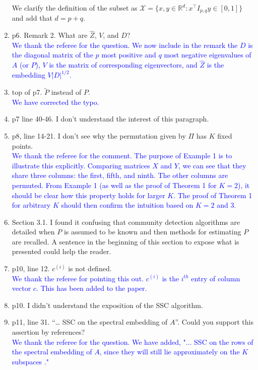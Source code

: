 \documentclass[
]{article}
\begin{document}
\begin{enumerate}
{  We clarify the definition of the subset as $\mathcal{X} = \{x, y \in \mathbb{R}^d : x^\top I_{p, q} y \in [0, 1]\}$ and add that $d = p + q$. 
  }
\item
  p6. Remark 2. What are \(\hat{Z}\), \(V\), and \(D\)?\\
  \textcolor{blue}{
  We thank the referee for the question. 
  We now include in the remark the $D$ is the diagonal matrix of the $p$ most positive and $q$ most negative eigenvalues of $A$ (or $P$), $V$ is the matrix of corresponding eigenvectors, and $\hat{Z}$ is the embedding $V |D|^{1/2}$.
  }
\item
  top of p7. \(\tilde{P}\) instead of \({P}\).\\
  \textcolor{blue}{
  We have corrected the typo. 
  }
\item
  p7 line 40-46. I don't understand the interest of this paragraph.
\item
  p8, line 14-21. I don't see why the permutation given by \(\Pi\) has
  \(K\) fixed points.\\
  \textcolor{blue}{
  We thank the referee for the comment. 
  The purpose of Example 1 is to illustrate this explicitly. 
  Comparing matrices $X$ and $Y$, we can see that they share three columns: the first, fifth, and ninth. 
  The other columns are permuted. 
  From Example 1 (as well as the proof of Theorem 1 for $K = 2$), it should be clear how this property holds for larger $K$. 
  The proof of Theorem 1 for arbitrary $K$ should then confirm the intuition based on $K = 2$ and $3$. 
  }
\item
  Section 3.1. I found it confusing that community detection algorithms
  are detailed when \(P\) is assumed to be known and then methods for
  estimating \(P\) are recalled. A sentence in the beginning of this
  section to expose what is presented could help the reader.
\item
  p10, line 12. \(c^{(i)}\) is not defined.\\
  \textcolor{blue}{
  We thank the referee for pointing this out. 
  $c^{(i)}$ is the $i^{th}$ entry of column vector $c$. 
  This has been added to the paper.
  }
\item
  p10. I didn't understand the exposition of the SSC algorithm.
\item
  p11, line 31. ``\ldots{} SSC on the spectral embedding of \(A\)''.
  Could you support this assertion by references?\\
  \textcolor{blue}{
  We thank the referee for the question. 
  We have added, "... SSC on the rows of the spectral embedding of $A$, since they will still lie approximately on the $K$ subspaces \citep{rubindelanchy2017statistical}."
}
\end{enumerate}
\end{document}

